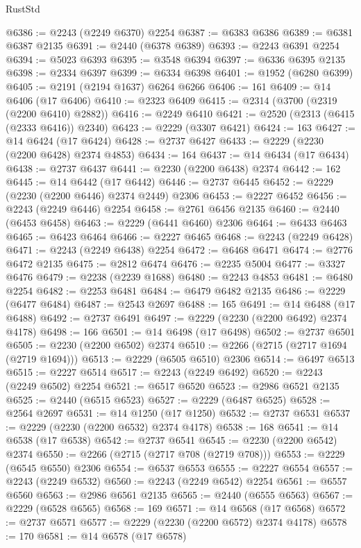 \begin{lexlean}{RustStd}
\begin{coremodule}
@6386 := @2243 (@2249 @6370) @2254
@6387 := @6383 @6386
@6389 := @6381 @6387 @2135
@6391 := @2440 (@6378 @6389)
@6393 := @2243 @6391 @2254
@6394 := @5023 @6393
@6395 := @3548 @6394
@6397 := @6336 @6395 @2135
@6398 := @2334 @6397
@6399 := @6334 @6398
@6401 := @1952 (@6280 @6399)
@6405 := @2191 (@2194 @1637) @6264 @6266
@6406 := 161
@6409 := @14 @6406 (@17 @6406)
@6410 := @2323 @6409
@6415 := @2314 (@3700 (@2319 (@2200 @6410) @2882))
@6416 := @2249 @6410
@6421 := @2520 (@2313 (@6415 (@2333 @6416)) @2340)
@6423 := @2229 (@3307 @6421)
@6424 := 163
@6427 := @14 @6424 (@17 @6424)
@6428 := @2737 @6427
@6433 := @2229 (@2230 (@2200 @6428) @2374 @4853)
@6434 := 164
@6437 := @14 @6434 (@17 @6434)
@6438 := @2737 @6437
@6441 := @2230 (@2200 @6438) @2374
@6442 := 162
@6445 := @14 @6442 (@17 @6442)
@6446 := @2737 @6445
@6452 := @2229 (@2230 (@2200 @6446) @2374 @2449) @2306
@6453 := @2227 @6452
@6456 := @2243 (@2249 @6446) @2254
@6458 := @2761 @6456 @2135
@6460 := @2440 (@6453 @6458)
@6463 := @2229 (@6441 @6460) @2306
@6464 := @6433 @6463
@6465 := @6423 @6464
@6466 := @2227 @6465
@6468 := @2243 (@2249 @6428)
@6471 := @2243 (@2249 @6438) @2254
@6472 := @6468 @6471
@6474 := @2776 @6472 @2135
@6475 := @2812 @6474
@6476 := @2235 @5004
@6477 := @3327 @6476
@6479 := @2238 (@2239 @1688)
@6480 := @2243 @4853
@6481 := @6480 @2254
@6482 := @2253 @6481
@6484 := @6479 @6482 @2135
@6486 := @2229 (@6477 @6484)
@6487 := @2543 @2697
@6488 := 165
@6491 := @14 @6488 (@17 @6488)
@6492 := @2737 @6491
@6497 := @2229 (@2230 (@2200 @6492) @2374 @4178)
@6498 := 166
@6501 := @14 @6498 (@17 @6498)
@6502 := @2737 @6501
@6505 := @2230 (@2200 @6502) @2374
@6510 := @2266 (@2715 (@2717 @1694 (@2719 @1694)))
@6513 := @2229 (@6505 @6510) @2306
@6514 := @6497 @6513
@6515 := @2227 @6514
@6517 := @2243 (@2249 @6492)
@6520 := @2243 (@2249 @6502) @2254
@6521 := @6517 @6520
@6523 := @2986 @6521 @2135
@6525 := @2440 (@6515 @6523)
@6527 := @2229 (@6487 @6525)
@6528 := @2564 @2697
@6531 := @14 @1250 (@17 @1250)
@6532 := @2737 @6531
@6537 := @2229 (@2230 (@2200 @6532) @2374 @4178)
@6538 := 168
@6541 := @14 @6538 (@17 @6538)
@6542 := @2737 @6541
@6545 := @2230 (@2200 @6542) @2374
@6550 := @2266 (@2715 (@2717 @708 (@2719 @708)))
@6553 := @2229 (@6545 @6550) @2306
@6554 := @6537 @6553
@6555 := @2227 @6554
@6557 := @2243 (@2249 @6532)
@6560 := @2243 (@2249 @6542) @2254
@6561 := @6557 @6560
@6563 := @2986 @6561 @2135
@6565 := @2440 (@6555 @6563)
@6567 := @2229 (@6528 @6565)
@6568 := 169
@6571 := @14 @6568 (@17 @6568)
@6572 := @2737 @6571
@6577 := @2229 (@2230 (@2200 @6572) @2374 @4178)
@6578 := 170
@6581 := @14 @6578 (@17 @6578)

\end{coremodule}
\end{lexlean}
